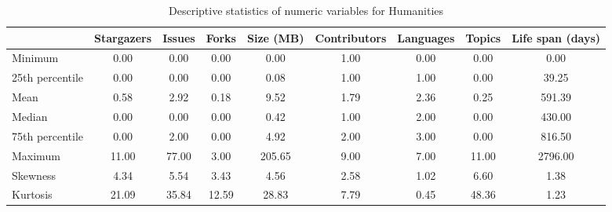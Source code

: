 
\begin{table}[h!]
\centering
\begin{adjustbox}{center}
\begin{tabular}{lcccccccc}
\toprule
{} &  Stargazers &  Issues &  Forks &  Size (MB) &  Contributors &  Languages &  Topics &  Life span (days) \\
\midrule
Minimum         &        0.00 &    0.00 &   0.00 &    0.00 &          1.00 &       0.00 &    0.00 &       0.00 \\
25th percentile &        0.00 &    0.00 &   0.00 &    0.08 &          1.00 &       1.00 &    0.00 &      39.25 \\
Mean            &        0.58 &    2.92 &   0.18 &    9.52 &          1.79 &       2.36 &    0.25 &     591.39 \\
Median          &        0.00 &    0.00 &   0.00 &    0.42 &          1.00 &       2.00 &    0.00 &     430.00 \\
75th percentile &        0.00 &    2.00 &   0.00 &    4.92 &          2.00 &       3.00 &    0.00 &     816.50 \\
Maximum         &       11.00 &   77.00 &   3.00 &  205.65 &          9.00 &       7.00 &   11.00 &    2796.00 \\
Skewness        &        4.34 &    5.54 &   3.43 &    4.56 &          2.58 &       1.02 &    6.60 &       1.38 \\
Kurtosis        &       21.09 &   35.84 &  12.59 &   28.83 &          7.79 &       0.45 &   48.36 &       1.23 \\
\bottomrule
\end{tabular}
\end{adjustbox}
\caption{Descriptive statistics of numeric variables for Humanities}
\end{table}
